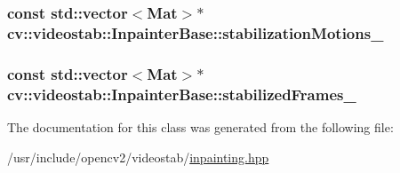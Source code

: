 \hypertarget{classcv_1_1videostab_1_1InpainterBase_ab778e2b654dbd54e36bb0aea388914ef}{
\subsubsection[{stabilization\-Motions\-\_\-}]{\setlength{\rightskip}{0pt plus 5cm}const std\-::vector$<$Mat$>$$\ast$ cv\-::videostab\-::\-Inpainter\-Base\-::stabilization\-Motions\-\_\-\hspace{0.3cm}{\ttfamily [protected]}}}\label{classcv_1_1videostab_1_1InpainterBase_ab778e2b654dbd54e36bb0aea388914ef}
\hypertarget{classcv_1_1videostab_1_1InpainterBase_a83e696d92ba2329bec22047f9298f2fb}{
\subsubsection[{stabilized\-Frames\-\_\-}]{\setlength{\rightskip}{0pt plus 5cm}const std\-::vector$<$Mat$>$$\ast$ cv\-::videostab\-::\-Inpainter\-Base\-::stabilized\-Frames\-\_\-\hspace{0.3cm}{\ttfamily [protected]}}}\label{classcv_1_1videostab_1_1InpainterBase_a83e696d92ba2329bec22047f9298f2fb}


The documentation for this class was generated from the following file\-:\begin{DoxyCompactItemize}
\item 
/usr/include/opencv2/videostab/\hyperlink{inpainting_8hpp}{inpainting.\-hpp}\end{DoxyCompactItemize}

